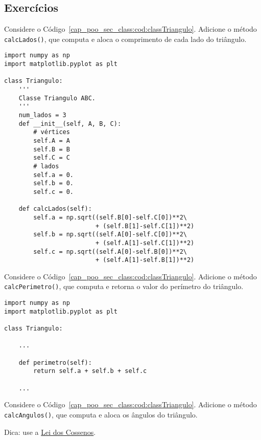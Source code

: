 \subsection{Exercícios}

\begin{exer}
  Considere o Código~\ref{cap_poo_sec_class:cod:classTriangulo}. Adicione o método \lstinline+calcLados()+, que computa e aloca o comprimento de cada lado do triângulo.
\end{exer}
\begin{resp}
\begin{lstlisting}
import numpy as np
import matplotlib.pyplot as plt

class Triangulo:
    '''
    Classe Triangulo ABC.
    '''
    num_lados = 3
    def __init__(self, A, B, C):
        # vértices
        self.A = A
        self.B = B
        self.C = C
        # lados
        self.a = 0.
        self.b = 0.
        self.c = 0.

    def calcLados(self):
        self.a = np.sqrt((self.B[0]-self.C[0])**2\
                         + (self.B[1]-self.C[1])**2)
        self.b = np.sqrt((self.A[0]-self.C[0])**2\
                         + (self.A[1]-self.C[1])**2)
        self.c = np.sqrt((self.A[0]-self.B[0])**2\
                         + (self.A[1]-self.B[1])**2)
\end{lstlisting}
\end{resp}

\begin{exer}
  Considere o Código~\ref{cap_poo_sec_class:cod:classTriangulo}. Adicione o método \lstinline+calcPerimetro()+, que computa e retorna o valor do perímetro do triângulo.
\end{exer}
\begin{resp}
\begin{lstlisting}
import numpy as np
import matplotlib.pyplot as plt

class Triangulo:

    ...

    def perimetro(self):
        return self.a + self.b + self.c

    ...
\end{lstlisting}
\end{resp}

\begin{exer}
  Considere o Código~\ref{cap_poo_sec_class:cod:classTriangulo}. Adicione o método \lstinline+calcAngulos()+, que computa e aloca os ângulos do triângulo.
\end{exer}
\begin{resp}
  Dica: use a \href{https://pt.wikipedia.org/wiki/Lei_dos_cossenos}{Lei dos Cossenos}.
\end{resp}

